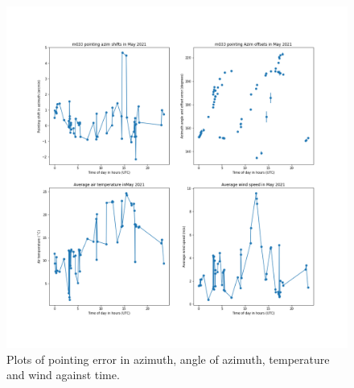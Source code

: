 \documentclass{article}
\begin{document}
\begin{figure}[H]
	\centering
	\includegraphics[scale=0.45]{m033_azim_May_mapped.png}
	
	\caption{Plots of pointing error in azimuth, angle of azimuth, temperature and wind against time.}
	\label{fig:m033AzimMayMapped}
\end{figure}
\end{document}
